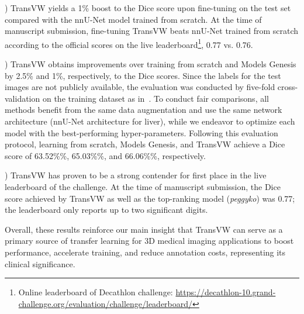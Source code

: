 \documentclass[journal,twoside,web]{ieeecolor}
\begin{document}
) TransVW yields a 1\% boost to the Dice score upon fine-tuning on the test set compared with the nnU-Net model trained from scratch. At the time of manuscript submission, fine-tuning TransVW beats nnU-Net trained from scratch according to the official scores on the live leaderboard\footnote{\label{foot:leaderboard}Online leaderboard of Decathlon challenge: \href{https://decathlon-10.grand-challenge.org/evaluation/challenge/leaderboard/}{https://decathlon-10.grand-challenge.org/evaluation/challenge/leaderboard/}}, 0.77 vs. 0.76. 

) TransVW obtains improvements over training from scratch and Models Genesis by 2.5\% and 1\%,  respectively, to the Dice scores. Since the labels for the test images are not publicly available, the evaluation was conducted by five-fold cross-validation on the training dataset as in~\cite{isensee2020automated}. To conduct fair comparisons, all methods benefit from the same data augmentation and use the same network architecture (nnU-Net architecture for liver), while we endeavor to optimize each model with the best-performing hyper-parameters. Following this evaluation protocol, learning from scratch, Models Genesis, and TransVW achieve a Dice score of 63.52\%\%, 65.03\%\%, and 66.06\%\%, respectively. 

) TransVW has proven to be a strong contender for first place in the live leaderboard of the challenge. At the time of manuscript submission, the Dice score achieved by TransVW as well as the top-ranking model (\textit{peggyko}) was 0.77; the leaderboard only reports up to two significant digits.


Overall, these results reinforce our main insight that TransVW can serve as a primary source of transfer learning for 3D medical imaging applications to boost performance, accelerate training, and reduce annotation costs, representing its clinical significance. 
\end{document}
